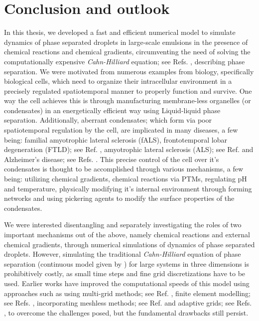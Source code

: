\onehalfspacing

\chapter{Conclusion and outlook}

\label{chap:Chapter_6}

In this thesis, we developed a fast and efficient numerical model to simulate dynamics of phase separated droplets in large-scale emulsions in the presence of chemical reactions and chemical gradients, circumventing the need of solving the computationally expensive \textit{Cahn-Hilliard} equation; see Refs. \cite{Review2019,CahnHilliardEq,Cahn1958}, describing phase separation.
We were motivated from numerous examples from biology, specifically biological cells, which need to organize their intracellular environment in a precisely regulated spatiotemporal manner to properly function and survive.
One way the cell achieves this is through manufacturing membrane-less organelles (or condensates) in an energetically efficient way using Liquid-liquid phase separation.
Additionally, aberrant condensates; which form via poor spatiotemporal regulation by the cell, are implicated in many diseases, a few being: familial amyotrophic lateral sclerosis (fALS), frontotemporal lobar degeneration (FTLD); see Ref. \cite{QAMAR2018720}, amyotrophic lateral sclerosis (ALS); see Ref. \cite{Mateju2017} and Alzheimer’s disease; see Refs. \cite{Williams2006,Mucke2009}.
This precise control of the cell over it's condensates is thought to be accomplished through various mechanisms, a few being: utilizing chemical gradients, chemical reactions via PTMs, regulating pH and temperature, physically modifying it's internal environment through forming networks and using pickering agents to modify the surface properties of the condensates.

We were interested disentangling and separately investigating the roles of two important mechanisms out of the above, namely chemical reactions and external chemical gradients, through numerical simulations of dynamics of phase separated droplets.
However, simulating the traditional \textit{Cahn-Hilliard} equation of phase separation (continuous model given by ) for large systems in three dimensions is prohibitively costly, as small time steps and fine grid discretizations have to be used.
Earlier works have improved the computational speeds of this model using approaches such as using multi-grid methods; see Ref. \cite{Lee2021_CH_model}, finite element modelling; see Refs. \cite{zhou2015, Chen2021}, incorporating meshless methods; see Ref. \cite{MOHAMMADI2019919} and adaptive grids; see Refs. \cite{BANAS20082,Ceniceros2007}, to overcome the challenges posed, but the fundamental drawbacks still persist.

